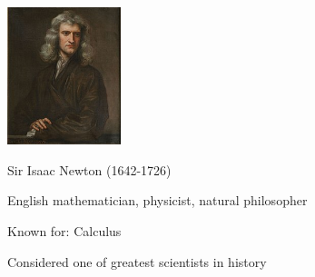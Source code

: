 \begin{frame}
\hfil\hfil \includegraphics[height=4cm]{../../modules/history/pictures/newton.jpg}

\hfil\hfil Sir Isaac Newton (1642-1726)

\hfil\hfil English mathematician, physicist, natural philosopher

\hfil\hfil Known for: Calculus

\hfil\hfil Considered one of greatest scientists in history

\end{frame}